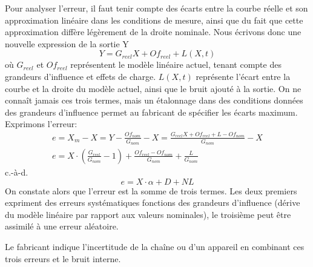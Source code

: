 Pour analyser l'erreur, il faut tenir compte des écarts entre la courbe réelle et son approximation linéaire dans les conditions de mesure, ainsi que du fait que cette approximation diffère légèrement de la droite nominale. Nous écrivons donc une nouvelle expression de la sortie Y
\begin{equation}
Y = G_{reel}X + Of_{reel} + L(X,t)
\end{equation}
où $G_{reel}$ et $Of_{reel}$ représentent le modèle linéaire actuel, tenant compte des grandeurs d'influence et effets de charge. $L(X,t)$ représente l'écart entre la courbe et la droite du modèle actuel, ainsi que le bruit ajouté à la sortie. On ne connaît jamais ces trois termes, mais un étalonnage dans des conditions données des grandeurs d'influence permet au fabricant de spécifier les écarts maximum. Exprimons l'erreur:
\begin{gather}
e = X_m - X =  Y - \frac{Of_{nom}}{G_{nom}} - X = \frac{G_{reel}X + Of_{reel} + L -Of_{nom}}{G_{nom}} - X\\
e = X \cdot(\frac{G_{reel}}{G_{nom}}   - 1) +  \frac{Of_{reel} - Of_{nom}}{G_{nom}}   +  \frac{L}{G_{nom}}
\end{gather}
c.-à-d.
\begin{equation}
e = X \cdot \alpha  + D + NL
\end{equation}
On constate alors que l'erreur est la somme de trois termes. Les deux premiers expriment des erreurs systématiques fonctions des grandeurs d'influence (dérive du modèle linéaire par rapport aux valeurs nominales), le troisième peut être assimilé à une erreur aléatoire.
\begin{center}
\end{center}
Le fabricant indique l'incertitude de la chaîne ou d'un appareil en combinant ces trois erreurs et le bruit interne.

